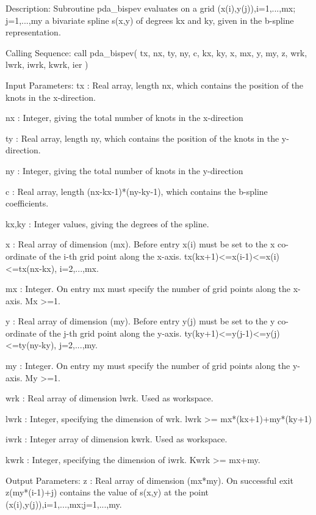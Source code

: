 \documentclass[11pt,twoside,nolof]{starlink}
\begin{document}
\begin{terminalv}
Description:
   Subroutine pda_bispev evaluates on a grid (x(i),y(j)),i=1,...,mx;
   j=1,...,my a bivariate spline s(x,y) of degrees kx and ky, given in
   the b-spline representation.

Calling Sequence:
   call pda_bispev( tx, nx, ty, ny, c, kx, ky, x, mx, y, my, z, wrk, lwrk,
                    iwrk, kwrk, ier )

Input Parameters:
   tx    : Real array, length nx, which contains the position of the
           knots in the x-direction.

   nx    : Integer, giving the total number of knots in the x-direction

   ty    : Real array, length ny, which contains the position of the
           knots in the y-direction.

   ny    : Integer, giving the total number of knots in the y-direction

   c     : Real array, length (nx-kx-1)*(ny-ky-1), which contains the
           b-spline coefficients.

   kx,ky : Integer values, giving the degrees of the spline.

   x     : Real array of dimension (mx). Before entry x(i) must be set to
           the x co-ordinate of the i-th grid point along the x-axis.
           tx(kx+1)<=x(i-1)<=x(i)<=tx(nx-kx), i=2,...,mx.

   mx    : Integer. On entry mx must specify the number of grid points along
           the x-axis. Mx >=1.

   y     : Real array of dimension (my). Before entry y(j) must be set to
           the y co-ordinate of the j-th grid point along the y-axis.
           ty(ky+1)<=y(j-1)<=y(j)<=ty(ny-ky), j=2,...,my.

   my    : Integer. On entry my must specify the number of grid points along
           the y-axis. My >=1.

   wrk   : Real array of dimension lwrk. Used as workspace.

   lwrk  : Integer, specifying the dimension of wrk.
           lwrk >= mx*(kx+1)+my*(ky+1)

   iwrk  : Integer array of dimension kwrk. Used as workspace.

   kwrk  : Integer, specifying the dimension of iwrk. Kwrk >= mx+my.

Output Parameters:
   z     : Real array of dimension (mx*my). On successful exit z(my*(i-1)+j)
           contains the value of s(x,y) at the point
           (x(i),y(j)),i=1,...,mx;j=1,...,my.


\end{terminalv}
\end{document}
